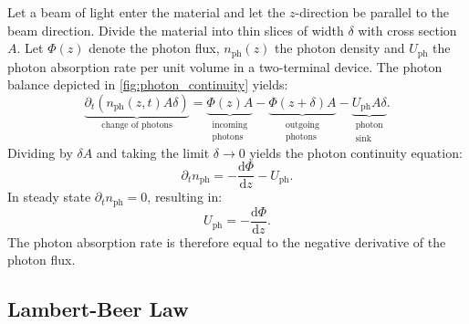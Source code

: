 Let a beam of light enter the material and let the $z$-direction be parallel to the
beam direction. Divide the material into thin slices of width $\delta$ with
cross section $A$. Let $\Phi(z)$ denote the photon flux, $n_{\mathrm{ph}}(z)$
the photon density and $U_{\mathrm{ph}}$ the photon absorption rate per unit
volume in a two-terminal device. The photon balance depicted in \cref{fig:photon_continuity}
yields:
\begin{equation}
	\underbrace{ \partial_{t}(n_{\mathrm{ph}}(z,t)A\delta) }_{ \text{change of
	photons} }= \underbrace{ \Phi(z)A }_{ \substack{\text{incoming} \\ \text{photons}}
	}- \underbrace{ \Phi(z+\delta)A }_{ \substack{\text{outgoing} \\ \text{photons}}
	}- \underbrace{ U_{\mathrm{ph}}A\delta }_{ \substack{\text{photon} \\ \text{sink}}
	}.
\end{equation}
Dividing by $\delta A$ and taking the limit $\delta \to 0$ yields the photon
continuity equation:
\begin{equation}
	\partial_{t}n_{\mathrm{ph}}= - \frac{\mathrm{d} \Phi}{\mathrm{d}z}-U_{\mathrm{ph}}
	.
\end{equation}
In steady state $\partial_{t}n_{\mathrm{ph}}= 0$, resulting in:
\begin{equation}
	U_{\mathrm{ph}}=-\frac{\mathrm{d} \Phi}{\mathrm{d}z}. \label{eq:photon_continuity_steady}
\end{equation}
The photon absorption rate is therefore equal to the negative derivative of the photon
flux.

\subsection{Lambert-Beer Law}
\label{sec:lambert_beer}

